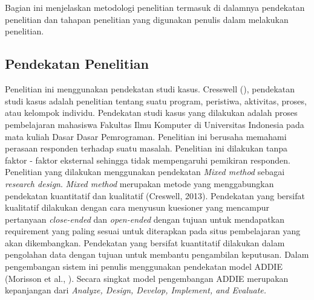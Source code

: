 \chapter{\babTiga}
Bagian ini menjelaskan metodologi penelitian termasuk di dalamnya pendekatan penelitian dan tahapan penelitian yang digunakan penulis dalam melakukan penelitian.
\section{Pendekatan Penelitian}

Penelitian ini  menggunakan pendekatan studi kasus. Cresswell (\citeyear{papper.Creswell}), pendekatan studi kasus adalah penelitian tentang suatu program, peristiwa, aktivitas, proses, atau kelompok individu. Pendekatan studi kasus yang dilakukan adalah proses pembelajaran mahasiswa Fakultas Ilmu Komputer di Universitas Indonesia pada mata kuliah Dasar Dasar Pemrograman. Penelitian ini berusaha memahami perasaan responden terhadap suatu masalah. Penelitian ini dilakukan tanpa faktor - faktor eksternal sehingga tidak mempengaruhi pemikiran responden.
\linebreak\linebreak
Penelitian yang dilakukan menggunakan pendekatan \textit{Mixed method} sebagai \textit{research design}. \textit{Mixed method} merupakan metode yang menggabungkan pendekatan kuantitatif dan kualitatif (Creswell, 2013). Pendekatan yang bersifat kualitatif dilakukan dengan cara menyusun kuesioner yang mencampur pertanyaan \textit{close-ended} dan \textit{open-ended} dengan tujuan untuk mendapatkan requirement yang paling sesuai untuk diterapkan pada situs pembelajaran yang akan dikembangkan. Pendekatan yang bersifat kuantitatif dilakukan dalam pengolahan data dengan tujuan untuk membantu pengambilan keputusan.
\linebreak\linebreak
Dalam pengembangan sistem ini penulis menggunakan pendekatan model ADDIE  (Morisson et al., \citeyear{book.morisson}). Secara singkat model pengembangan ADDIE merupakan kepanjangan dari \textit{Analyze, Design, Develop, Implement, and Evaluate.}


